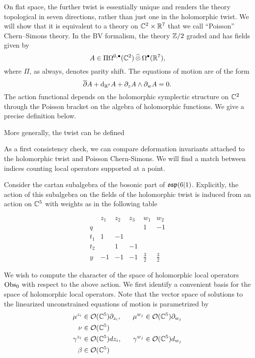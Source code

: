 \documentclass[11pt]{amsart}
\begin{document}
On flat space, the further twist is essentially unique and renders the theory topological in seven directions, rather than just one in the holomorphic twist. 
We will show that it is equivalent to a theory on $\mathbb C^2 \times \mathbb R^7$ that we call ``Poisson'' Chern--Simons theory. 
In the BV formalism, the theory $\mathbb Z/2$ graded and has fields given by
\[
A \in \Pi \Omega^{0,\bullet}(\mathbb C^2) \, \widehat{\otimes} \, \Omega^\bullet(\mathbb R^7) ,
\]
where $\Pi$, as always, denotes parity shift.
The equations of motion are of the form
\[
\overline{\partial} A + {\rm d}_{\mathbb R^7} A + \partial_{z} A \wedge \partial_{w} A = 0 .
\]
The action functional depends on the holomorphic symplectic structure on $\mathbb C^2$ through the Poisson bracket on the algebra of holomorphic functions.
We give a precise definition below. 

More generally, the twist can be defined 

\parsec

As a first consistency check, we can compare deformation invariants attached to the holomorphic twist and Poisson Chern-Simons. We will find a match between indices counting local operators supported at a point.

Consider the cartan subalgebra of the bosonic part of $\mathfrak{osp}(6|1)$. Explicitly, the action of this subalgebra on the fields of the holomorphic twist is induced from an action on $\mathbb{C}^5$ with weights as in the following table

\[\begin{array}{|c|c|c|c|c|c|}
& z_1 & z_2 & z_3 & w_1 & w_2 \\
\hline
q & & & & 1 & -1 \\
t_1 & 1 & -1 & & & \\
t_2 & & 1 & -1 & & \\
y & -1 & -1 & -1 &\frac 3 2 & \frac 3 2
\end{array}\]

We wish to compute the character of the space of holomorphic local operators ${\rm Obs}_0$ with respect to the above action. We first identify a convenient basis for the space of holomorphic local operators. Note that the vector space of solutions to the linearized unconstrained equations of motion is parametrized by 
\begin{align*}
\mu^{z_i} & \in \mathcal O(\mathbb{C}^5)\partial_{z_i},\ \ \ \ \ \mu^{w_j}\in\mathcal O (\mathbb{C}^5)\partial_{w_j}  \\
\nu & \in \mathcal O (\mathbb{C}^5) \\
\gamma^{z_i} & \in \mathcal O (\mathbb{C}^5)dz_i, \ \ \ \ \ \gamma^{w_j}\in\mathcal O (\mathbb{C}^5)d_{w_j} \\
\beta & \in \mathcal O (\mathbb{C}^5)
\end{align*}
\end{document}
